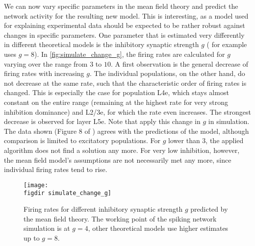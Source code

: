 We can now vary specific parameters in the mean field theory
and predict the network activity for the resulting new 
model. This is interesting, as a model used for explaining 
experimental data should be expected to be rather robust against
changes in specific parameters. One parameter that is estimated 
very differently in different theoretical models 
is the inhibitory synaptic 
strength $g$ ( for example uses $g = 8$). 
In \autoref{fig:simulate_change_g}, the firing rates are calculated for $g$ 
varying over the range from $3$ to $10$. A first observation is the general
decrease of firing rates with increasing $g$. The individual populations, 
on the other hand, do not decrease at the same rate, such that the characteristic order 
of firing rates is changed. This is especially the case for population L4e, 
which stays almost constant on the entire range (remaining at the highest rate 
for very strong inhibition dominance) and L2/3e, for which the rate even 
increases. The strongest decrease is observed for layer L5e.
Note that  apply this change in $g$ in simulation. 
The data shown (Figure 8 of \cite{potjans2014}) agrees with the predictions
of the model, although comparison is limited to excitatory populations. 
For $g$ lower than $3$, the applied algorithm does not find a solution 
any more. For very low inhibition, however, the mean field model's assumptions
are not necessarily met any more, since individual firing rates tend to rise. 

\begin{figure}[tb]
    \centering
    \texttt{[image: \\figdir simulate\_change\_g]}
    \caption[Firing rates for different $g$]{
        Firing rates for different inhibitory synaptic strength $g$
        predicted by the mean field theory. The working point of 
        the spiking network simulation is at $g = 4$, other theoretical
        models use higher estimates up to $g = 8$. 
    }
    \label{fig:simulate_change_g}
\end{figure}


\FloatBarrier
